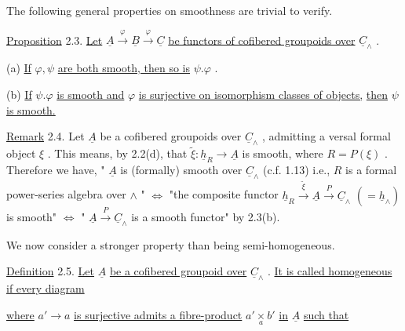 The following general properties on smoothness are trivial to verify.

\underline{Proposition} 2.3.  \underline{Let}  $\underline{A} \xrightarrow{\ \varphi\ } \underline{B} \xrightarrow{\ \varphi\ } \underline{C}$  \underline{be functors of cofibered groupoids over}  $\underline{C}_\wedge$ .

(a)  \underline{If}  $\varphi, \psi$  \underline{are both smooth, then so is}  $\psi.\varphi$ .

(b)  \underline{If}  $\psi.\varphi$  \underline{is smooth and}  $\varphi$  \underline{is surjective on isomorphism classes of objects,}
\underline{then}  $\psi$  \underline{is smooth.}

\underline{Remark} 2.4.  Let  $\underline{A}$  be a cofibered groupoids over  $\underline{C}_\wedge$ , admitting a versal formal object  $\xi$ . This means, by 2.2(d), that  $\tilde{\xi} : \underline{h}_R \to \underline{A}$  is smooth, where  $R = P(\xi)$ . Therefore we have,  " $\underline{A}$  is (formally) smooth over  $\underline{C}_\wedge$  (c.f. 1.13) i.e.,  $R$  is a formal power-series algebra over  $\wedge$ "  $\Leftrightarrow$  "the composite functor  $\underline{h}_R \xrightarrow{\ \tilde{\xi}\ } \underline{A} \xrightarrow{\ P\ } \underline{C}_\wedge$   $(= \underline{h}_\wedge)$   is smooth"  $\Leftrightarrow$  " $\underline{A} \xrightarrow{\ P\ } \underline{C}_\wedge$  is a smooth functor"  by 2.3(b).

We now consider a stronger property than being semi-homogeneous.

\underline{Definition} 2.5.  \underline{Let}  $\underline{A}$  \underline{be a cofibered groupoid over}  $\underline{C}_\wedge$ . \underline{It is called homogeneous if every diagram}

\begin{center}
\end{center}
\underline{where}  $a' \to a$  \underline{is surjective admits a fibre-product}  $a' \underset{a}{\times} b'$  \underline{in}  $\underline{A}$  \underline{such that}

